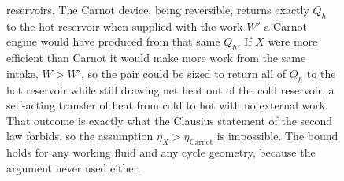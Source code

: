 \begin{figure}[htbp]
{reservoirs. The Carnot device, being reversible, returns exactly $Q_h$ to the
hot reservoir when supplied with the work $W'$ a Carnot engine would have
produced from that same $Q_h$. If $X$ were more efficient than Carnot it would
make more work from the same intake, $W > W'$, so the pair could be sized to
return all of $Q_h$ to the hot reservoir while still drawing net heat out of the
cold reservoir, a self-acting transfer of heat from cold to hot with no external
work. That outcome is exactly what the Clausius statement of the second law
forbids, so the assumption $\eta_X > \eta_{\text{Carnot}}$ is impossible. The
bound holds for any working fluid and any cycle geometry, because the argument
never used either.}
\label{fig:vol04ch03:carnot-theorem-proof}
\end{figure}

